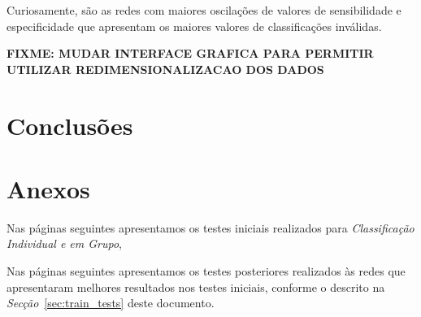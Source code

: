 \documentclass{article}
\begin{document}
Curiosamente, são as redes com maiores oscilações de valores de sensibilidade e especificidade que apresentam os maiores valores de classificações inválidas.


\textbf{FIXME: MUDAR INTERFACE GRAFICA PARA PERMITIR UTILIZAR REDIMENSIONALIZACAO DOS DADOS}


\pagebreak

\section{Conclusões}


\pagebreak

\section{Anexos}

Nas páginas seguintes apresentamos os testes iniciais realizados para \emph{Classificação Individual e em Grupo}, 



Nas páginas seguintes apresentamos os testes posteriores realizados às redes que apresentaram melhores resultados nos testes iniciais, conforme o descrito na \emph{Secção}~\ref{sec:train_tests} deste documento.
\end{document}
